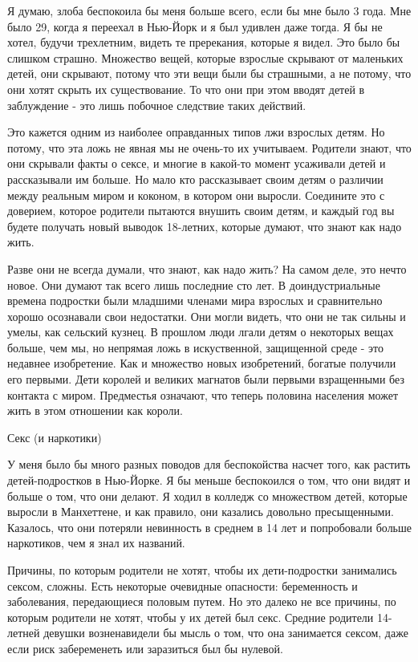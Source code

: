 \documentclass[ebook,12pt,oneside,openany]{memoir}
\begin{document}
Я думаю, злоба беспокоила бы меня больше всего, если бы мне было 3
года. Мне было 29, когда я переехал в Нью-Йорк и я был удивлен даже
тогда. Я бы не хотел, будучи трехлетним, видеть те пререкания, которые
я видел. Это было бы слишком страшно. Множество вещей, которые
взрослые скрывают от маленьких детей, они скрывают, потому что эти
вещи были бы страшными, а не потому, что они хотят скрыть их
существование. То что они при этом вводят детей в заблуждение - это
лишь побочное следствие таких действий.

Это кажется одним из наиболее оправданных типов лжи взрослых детям. Но
потому, что эта ложь не явная мы не очень-то их учитываем. Родители
знают, что они скрывали факты о сексе, и многие в какой-то момент
усаживали детей и рассказывали им больше. Но мало кто рассказывает
своим детям о различии между реальным миром и коконом, в котором они
выросли. Соедините это с доверием, которое родители пытаются внушить
своим детям, и каждый год вы будете получать новый выводок 18-летних,
которые думают, что знают как надо жить.

Разве они не всегда думали, что знают, как надо жить? На самом деле,
это нечто новое. Они думают так всего лишь последние сто лет. В
доиндустриальные времена подростки были младшими членами мира взрослых
и сравнительно хорошо осознавали свои недостатки. Они могли видеть,
что они не так сильны и умелы, как сельский кузнец. В прошлом люди
лгали детям о некоторых вещах больше, чем мы, но непрямая ложь в
искуственной, защищенной среде - это недавнее изобретение. Как и
множество новых изобретений, богатые получили его первыми. Дети
королей и великих магнатов были первыми взращенными без контакта с
миром. Предместья означают, что теперь половина населения может жить в
этом отношении как короли.

Секс (и наркотики)

У меня было бы много разных поводов для беспокойства насчет того, как
растить детей-подростков в Нью-Йорке. Я бы меньше беспокоился о том,
что они видят и больше о том, что они делают. Я ходил в колледж со
множеством детей, которые выросли в Манхеттене, и как правило, они
казались довольно пресыщенными. Казалось, что они потеряли невинность
в среднем в 14 лет и попробовали больше наркотиков, чем я знал их
названий.

Причины, по которым родители не хотят, чтобы их дети-подростки
занимались сексом, сложны. Есть некоторые очевидные опасности:
беременность и заболевания, передающиеся половым путем. Но это далеко
не все причины, по которым родители не хотят, чтобы у их детей был
секс. Средние родители 14-летней девушки возненавидели бы мысль о том,
что она занимается сексом, даже если риск забеременеть или заразиться
был бы нулевой.
\end{document}
